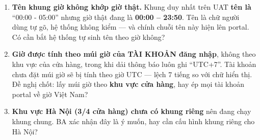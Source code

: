 \mhoi

\begin{ask}
\begin{enumerate}[leftmargin=*]
  \item \textbf{Tên khung giờ không khớp giờ thật.} Khung duy nhất trên UAT \textbf{tên là}
        ``00:00 - 05:00'' nhưng giờ thật đang là \textbf{00:00 -- 23:50}. Tên là chữ người dùng
        tự gõ, hệ thống không kiểm --- và chính chuỗi tên này hiện lên portal. Có cần bắt hệ
        thống tự sinh tên theo giờ không?
  \item \textbf{Giờ được tính theo múi giờ của TÀI KHOẢN đăng nhập}, không theo khu vực của cửa
        hàng, trong khi dải thông báo luôn ghi ``UTC+7''. Tài khoản chưa đặt múi giờ sẽ bị tính
        theo giờ UTC --- lệch 7 tiếng so với chữ hiển thị. Đề nghị chốt: lấy múi giờ theo
        \textbf{khu vực cửa hàng}, hay ép mọi tài khoản portal về giờ Việt Nam?
  \item \textbf{Khu vực Hà Nội (3/4 cửa hàng) chưa có khung riêng} nên đang chạy khung chung. BA
        xác nhận đây là ý muốn, hay cần cấu hình khung riêng cho Hà Nội?
\end{enumerate}
\end{ask}
